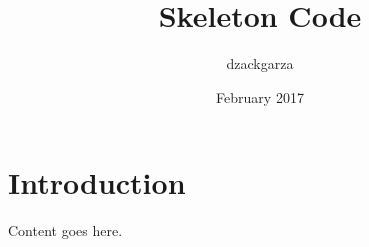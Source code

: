 \documentclass{article}
\title{Skeleton Code}
\author{dzackgarza }
\date{February 2017}
\begin{document}
\maketitle

\section{Introduction}

Content goes here.
\end{document}
